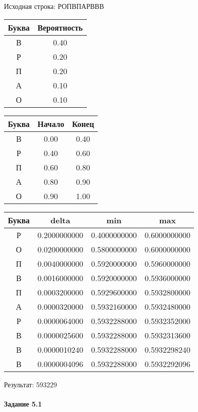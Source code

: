 \documentclass[a4paper, 12pt]{article}
\begin{document}
Исходная строка: РОПВПАРВВВ\
\begin{center}
 \begin{tabular}{ |c|c| } 
  \hline
     Буква & Вероятность \\ \hline
В & 0.40\\\hline
Р & 0.20\\\hline
П & 0.20\\\hline
А & 0.10\\\hline
О & 0.10
\\ \hline \end{tabular}
\end{center}
\begin{center}
 \begin{tabular}{ |c|c|c| } 
  \hline
     Буква & Начало & Конец \\ \hline
В & 0.00 & 0.40\\\hline
Р & 0.40 & 0.60\\\hline
П & 0.60 & 0.80\\\hline
А & 0.80 & 0.90\\\hline
О & 0.90 & 1.00
\\ \hline \end{tabular}
\end{center}
\begin{center}
 \begin{tabular}{ |c|c|c|c| } 
  \hline
     Буква & delta & min & max \\ \hline
Р & 0.2000000000 & 0.4000000000 & 0.6000000000\\\hline
О & 0.0200000000 & 0.5800000000 & 0.6000000000\\\hline
П & 0.0040000000 & 0.5920000000 & 0.5960000000\\\hline
В & 0.0016000000 & 0.5920000000 & 0.5936000000\\\hline
П & 0.0003200000 & 0.5929600000 & 0.5932800000\\\hline
А & 0.0000320000 & 0.5932160000 & 0.5932480000\\\hline
Р & 0.0000064000 & 0.5932288000 & 0.5932352000\\\hline
В & 0.0000025600 & 0.5932288000 & 0.5932313600\\\hline
В & 0.0000010240 & 0.5932288000 & 0.5932298240\\\hline
В & 0.0000004096 & 0.5932288000 & 0.5932292096
\\ \hline \end{tabular}
\end{center}
Результат: 593229
\pagebreak
\paragraph{Задание 5.1}
\end{document}
